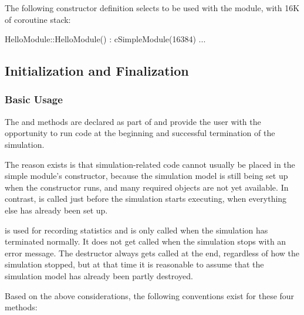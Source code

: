 The following constructor definition selects  to be used
with the module, with 16K of coroutine stack:

\begin{cpp}
HelloModule::HelloModule() : cSimpleModule(16384) {...}
\end{cpp}



\subsection{Initialization and Finalization}
\label{sec:simple-modules:initialize-and-finish}

\subsubsection{Basic Usage}
\label{sec:simple-modules:init-finish:basic-usage}

The  and  methods are declared
as part of  and provide the user with the opportunity
to run code at the beginning and successful termination of the simulation.

The reason  exists is that simulation-related code
cannot usually be placed in the simple module's
constructor, because the simulation model is still
being set up when the constructor runs, and many required objects are not yet
available. In contrast,  is called just before the
simulation starts executing, when everything else has already been set up.

 is used for recording statistics and is only called
when the simulation has terminated normally. It does not get called when
the simulation stops with an error message. The destructor always
gets called at the end, regardless of how the simulation stopped, but
at that time it is reasonable to assume that the simulation model has already been
partly destroyed.

Based on the above considerations, the following conventions exist
for these four methods:

